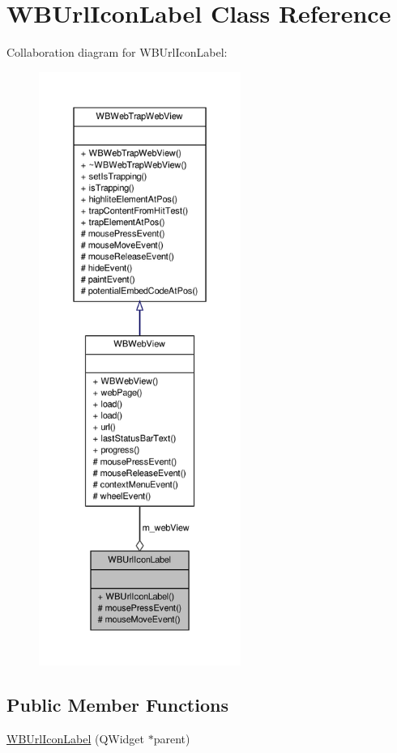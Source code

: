 \hypertarget{class_w_b_url_icon_label}{\section{W\-B\-Url\-Icon\-Label Class Reference}
\label{d3/d3f/class_w_b_url_icon_label}
}


Collaboration diagram for W\-B\-Url\-Icon\-Label\-:
\nopagebreak
\begin{figure}[H]
\begin{center}
\leavevmode
\includegraphics[height=550pt]{d8/da1/class_w_b_url_icon_label__coll__graph}
\end{center}
\end{figure}
\subsection*{Public Member Functions}
\begin{DoxyCompactItemize}
\item 
\hyperlink{class_w_b_url_icon_label_a8f59e6d48d3e640d1692c2187c73485b}{W\-B\-Url\-Icon\-Label} (Q\-Widget $\ast$parent)
\end{DoxyCompactItemize}
